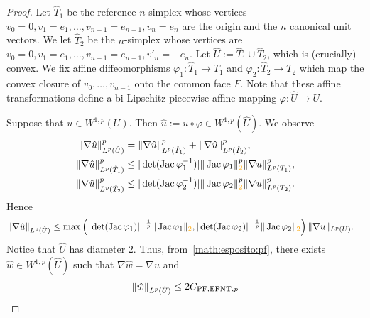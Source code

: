 \documentclass[10pt,letterpaper]{article}
\newcommand\cye[1]{%
  \protect\leavevmode
  \begingroup
    \color{red!35!yellow}%
    #1%
  \endgroup
}
\begin{document}
\begin{proof}
    Let $\hat T_1$ be the reference $n$-simplex whose vertices $v_0=0, v_1=e_1, \dots, v_{n-1} = e_{n-1}, v_n = e_n$ are the origin and the $n$ canonical unit vectors. 
    We let $\hat T_2$ be the $n$-simplex whose vertices are $v_0=0, v_1=e_1, \dots, v_{n-1} = e_{n-1}, v'_n = -e_n$. 
    Let $\hat U := \hat T_1 \cup \hat T_2$, which is \cye{(crucially)} convex. 
    We fix affine diffeomorphisms $\varphi_1 : \hat T_1 \rightarrow T_1$ and $\varphi_2 : \hat T_2 \rightarrow T_2$
    which map the convex closure of $v_0, \dots, v_{n-1}$ onto the common face $F$.
    Note that these affine transformations define a bi-Lipschitz \cye{piecewise affine} mapping $\varphi : \hat U \rightarrow U$. 
    
    Suppose that $u \in W^{1,p}(U)$. Then $\hat u := u \circ \varphi \in W^{1,p}(\hat U)$. 
    We observe 
    \begin{subequations}\label{equation:map_bounds}\begin{align}
        \| \nabla \hat u \|_{L^{p}(\hat U)}^{p}
        &=
        \| \nabla \hat u \|_{L^{p}(\hat T_1)}^{p}
        +
        \| \nabla \hat u \|_{L^{p}(\hat T_2)}^{p}
        ,
        \\
        \| \nabla \hat u \|_{L^{p}(\hat T_1)}^{p}
        &\leq 
        |\det(\Jacobian \varphi_1^{-1})|
        \| \Jacobian \varphi_1 \|_{\cye{2}}^{p}
        \| \nabla u \|_{L^{p}(T_1)}^{p}
        ,
        \\
        \| \nabla \hat u \|_{L^{p}(\hat T_2)}^{p}
        &\leq 
        |\det(\Jacobian \varphi_2^{-1})|
        \| \Jacobian \varphi_2 \|_{\cye{2}}^{p}
        \| \nabla u \|_{L^{p}(T_2)}^{p}
        .
    \end{align}\end{subequations}
    Hence 
    \begin{align*}
        \| \nabla \hat u \|_{L^{p}(\hat U)}
        &\leq 
        \max\left( 
            |\det(\Jacobian \varphi_1)|^{-\frac 1 p} \| \Jacobian \varphi_1 \|_{\cye{2}}
            ,
            |\det(\Jacobian \varphi_2)|^{-\frac 1 p} \| \Jacobian \varphi_2 \|_{\cye{2}}
        \right)
        \| \nabla u \|_{L^{p}(U)}
        .
    \end{align*}
    Notice that $\hat U$ has diameter $2$. \cye{Thus, from~\eqref{math:esposito:pf},} there exists $\hat w \in W^{1,p}(\hat U)$ such that $\nabla \hat w = \nabla \hat u$ and 
    \begin{align*}
        \| \hat w \|_{L^{p}(\hat U)}
        \leq 
        2 C_{\PF,{\rm EFNT},p}

\end{align*}
\end{proof}
\end{document}

